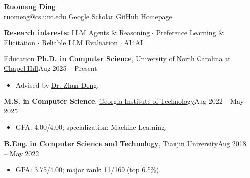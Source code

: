 \documentclass{resume}
\begin{document}
\fontsize{10}{11.5}\selectfont
\begin{center}
{\huge\bfseries Ruomeng Ding}\\[5pt]
\href{mailto:ruomeng@cs.unc.edu}{ruomeng@cs.unc.edu}\quad
\href{https://scholar.google.com/citations?user=aPlu2rYAAAAJ&hl=en}{Google Scholar}\quad
\href{https://github.com/ruomengd}{GitHub}\quad
\href{https://ruomengd.github.io/}{Homepage}
\end{center}
\begingroup
\makeatletter\let\@bibitem\saved@bibitem\makeatother
{}
\endgroup


\begin{center}
\textbf{Research interests:} LLM Agents \& Reasoning $\cdot$ Preference Learning \& Elicitation $\cdot$ Reliable LLM Evaluation $\cdot$ AI4AI
\end{center}

\begin{rSection}{Education}
\textbf{Ph.D. in Computer Science}, \href{https://www.unc.edu/}{University of North Carolina at Chapel Hill}\hfill Aug 2025 -- Present
\begin{itemize}
\item Advised by \href{https://www.zhundeng.org/home}{Dr. Zhun Deng}.
\end{itemize}
\textbf{M.S. in Computer Science}, \href{https://www.gatech.edu/}{Georgia Institute of Technology}\hfill Aug 2022 -- May 2025
\begin{itemize}
\item GPA: 4.00/4.00; specialization: Machine Learning.
\end{itemize}
\textbf{B.Eng. in Computer Science and Technology}, \href{https://www.tju.edu.cn/english/index.htm}{Tianjin University}\hfill Aug 2018 -- May 2022
\begin{itemize}
\item GPA: 3.75/4.00; major rank: 11/169 (top 6.5\%).
\end{itemize}
\end{rSection}
\end{document}
